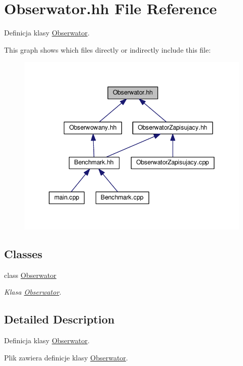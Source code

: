 \hypertarget{a00044}{}\section{Obserwator.\+hh File Reference}
\label{a00044}


Definicja klasy \hyperlink{a00013}{Obserwator}.  


This graph shows which files directly or indirectly include this file\+:
\nopagebreak
\begin{figure}[H]
\begin{center}
\leavevmode
\includegraphics[width=344pt]{a00091}
\end{center}
\end{figure}
\subsection*{Classes}
\begin{DoxyCompactItemize}
\item 
class \hyperlink{a00013}{Obserwator}
\begin{DoxyCompactList}\small\item\em Klasa \hyperlink{a00013}{Obserwator}. \end{DoxyCompactList}\end{DoxyCompactItemize}


\subsection{Detailed Description}
Definicja klasy \hyperlink{a00013}{Obserwator}. 

Plik zawiera definicje klasy \hyperlink{a00013}{Obserwator}. 